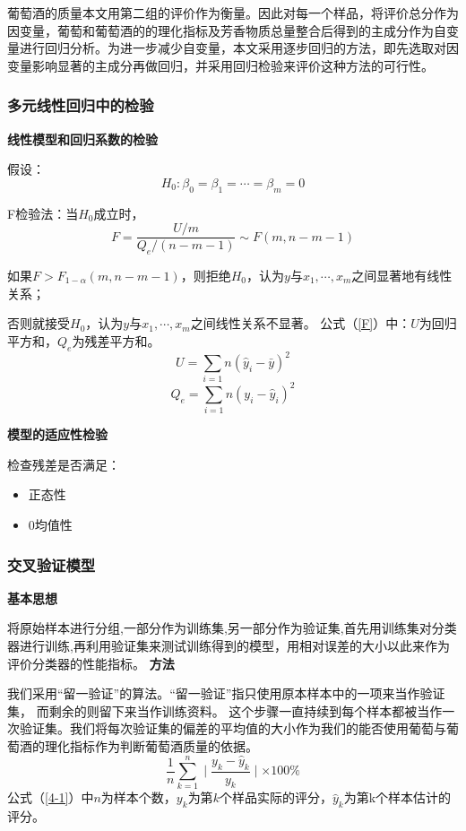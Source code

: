 \documentclass[withoutpreface,bwprint]{cumcmthesis} %
\begin{document}
\par 葡萄酒的质量本文用第二组的评价作为衡量。因此对每一个样品，将评价总分作为因变量，葡萄和葡萄酒的的理化指标及芳香物质总量整合后得到的主成分作为自变量进行回归分析。为进一步减少自变量，本文采用逐步回归的方法，即先选取对因变量影响显著的主成分再做回归，并采用回归检验来评价这种方法的可行性。

\subsubsection{多元线性回归中的检验}
\textbf{线性模型和回归系数的检验}
\par 假设：
\begin{equation}
\label{h0}
	H_0: \beta_0 = \beta_1 =\cdots =\beta_m=0
\end{equation}

\par F检验法：当$H_0$成立时，
\begin{equation}
\label{F}
	F = \frac{U/m}{Q_e/(n-m-1)} \sim F(m,n-m-1)
\end{equation}
\par 如果$F>F_{1-\alpha}(m,n-m-1)$，则拒绝$H_0$，认为$y$与$x_1,\cdots,x_m$之间显著地有线性关系；
\par 否则就接受$H_0$，认为$y$与$x_1,\cdots,x_m$之间线性关系不显著。
公式（\ref{F}）中：$U$为回归平方和，$Q_e$为残差平方和。
$$
U = \sum\limits_{i=1}{n}(\hat{y}_i-\bar{y})^2
$$
$$
Q_e = \sum\limits_{i=1}{n}(y_i-\hat{y}_i)^2
$$

\textbf{模型的适应性检验}
\par 检查残差是否满足：
\begin{itemize}
	\item 正态性
	\item 0均值性
\end{itemize}
\subsubsection{交叉验证模型}
\textbf{基本思想}
\par 将原始样本进行分组,一部分作为训练集,另一部分作为验证集,首先用训练集对分类器进行训练,再利用验证集来测试训练得到的模型，用相对误差的大小以此来作为评价分类器的性能指标。
\textbf{方法}
\par 我们采用“留一验证”的算法。“留一验证”指只使用原本样本中的一项来当作验证集， 而剩余的则留下来当作训练资料。 这个步骤一直持续到每个样本都被当作一次验证集。我们将每次验证集的偏差的平均值的大小作为我们的能否使用葡萄与葡萄酒的理化指标作为判断葡萄酒质量的依据。
\begin{equation}
	\label{4-1}
	\frac{1}{n}\sum\limits_{k=1}^{n}\mid \frac{y_k-\hat{y}_k}{y_k} \mid \times 100\%
\end{equation}
公式（\ref{4-1}）中$n$为样本个数，$y_k$为第$k$个样品实际的评分，$\hat{y}_k$为第k个样本估计的评分。
\end{document}
